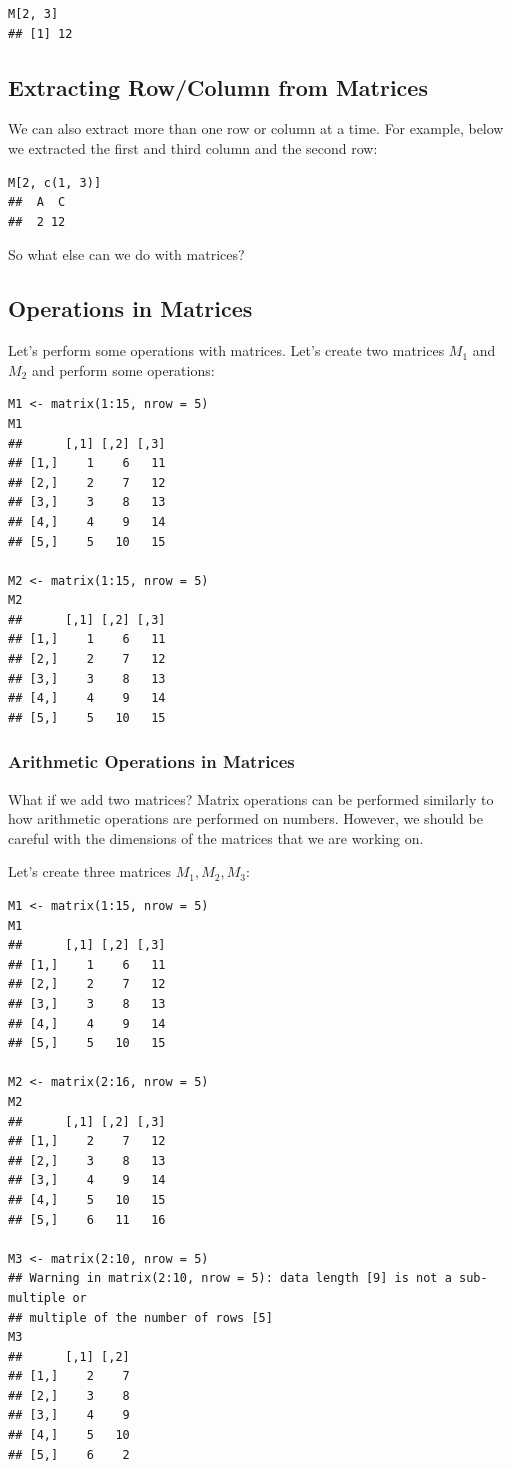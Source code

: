 \documentclass[12pt]{book}
\begin{document}
\begin{verbatim}
M[2, 3]
## [1] 12
\end{verbatim}

\subsection{Extracting Row/Column from Matrices}

We can also extract more than one row or column at a time. For example, below we extracted the first and third column and the second row:

\begin{verbatim}
M[2, c(1, 3)]
##  A  C 
##  2 12
\end{verbatim}

So what else can we do with matrices?

\subsection{Operations in Matrices}

Let’s perform some operations with matrices. Let’s create two matrices \( M_1 \) and \( M_2 \) and perform some operations:

\begin{verbatim}
M1 <- matrix(1:15, nrow = 5)
M1
##      [,1] [,2] [,3]
## [1,]    1    6   11
## [2,]    2    7   12
## [3,]    3    8   13
## [4,]    4    9   14
## [5,]    5   10   15

M2 <- matrix(1:15, nrow = 5)
M2
##      [,1] [,2] [,3]
## [1,]    1    6   11
## [2,]    2    7   12
## [3,]    3    8   13
## [4,]    4    9   14
## [5,]    5   10   15
\end{verbatim}

\subsubsection{Arithmetic Operations in Matrices}

What if we add two matrices? Matrix operations can be performed similarly to how arithmetic operations are performed on numbers. However, we should be careful with the dimensions of the matrices that we are working on.

Let’s create three matrices \( M_1, M_2, M_3 \):

\begin{verbatim}
M1 <- matrix(1:15, nrow = 5)
M1
##      [,1] [,2] [,3]
## [1,]    1    6   11
## [2,]    2    7   12
## [3,]    3    8   13
## [4,]    4    9   14
## [5,]    5   10   15

M2 <- matrix(2:16, nrow = 5)
M2
##      [,1] [,2] [,3]
## [1,]    2    7   12
## [2,]    3    8   13
## [3,]    4    9   14
## [4,]    5   10   15
## [5,]    6   11   16

M3 <- matrix(2:10, nrow = 5)
## Warning in matrix(2:10, nrow = 5): data length [9] is not a sub-multiple or
## multiple of the number of rows [5]
M3
##      [,1] [,2]
## [1,]    2    7
## [2,]    3    8
## [3,]    4    9
## [4,]    5   10
## [5,]    6    2
\end{verbatim}
\end{document}
